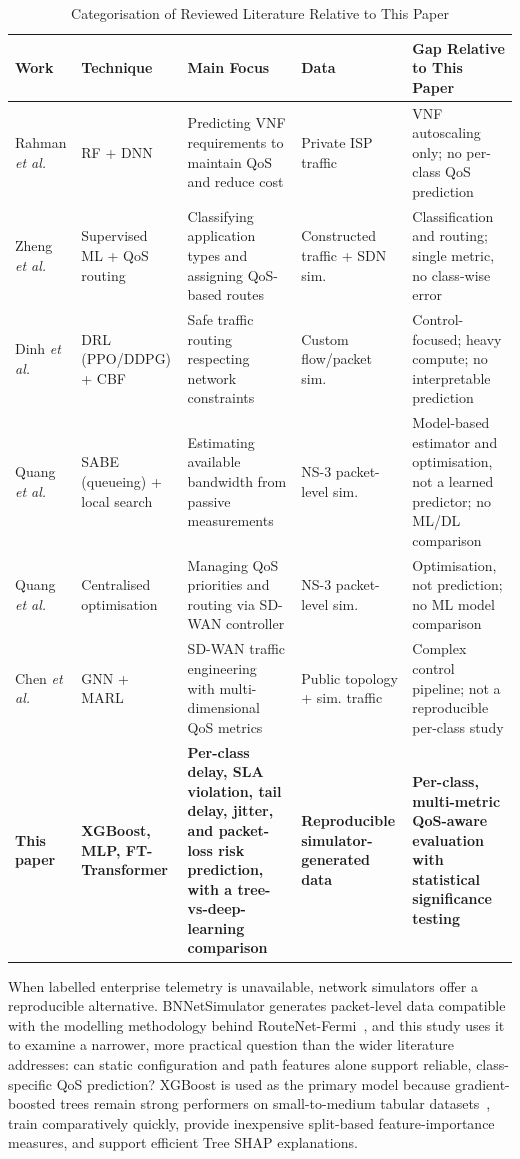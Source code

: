 \documentclass[conference]{IEEEtran}
\begin{document}
\begin{table}[t]
\caption{Categorisation of Reviewed Literature Relative to This Paper}
\label{tab:lit-comparison}
\centering
\scriptsize
\setlength{\tabcolsep}{4pt}
\begin{tabular}{p{2.1cm}p{2.4cm}p{3.3cm}p{2.1cm}p{4.7cm}}
\toprule
Work & Technique & Main Focus & Data & Gap Relative to This Paper \\
\midrule
Rahman \emph{et al.}~\cite{rahman2019autoscaling} & RF + DNN & Predicting VNF requirements to maintain QoS and reduce cost & Private ISP traffic & VNF autoscaling only; no per-class QoS prediction \\
Zheng \emph{et al.}~\cite{zheng2022applicationaware} & Supervised ML + QoS routing & Classifying application types and assigning QoS-based routes & Constructed traffic + SDN sim. & Classification and routing; single metric, no class-wise error \\
Dinh \emph{et al.}~\cite{dinh2024safeloadbalancing} & DRL (PPO/DDPG) + CBF & Safe traffic routing respecting network constraints & Custom flow/packet sim. & Control-focused; heavy compute; no interpretable prediction \\
Quang \emph{et al.}~\cite{quang2023globalqos} & SABE (queueing) + local search & Estimating available bandwidth from passive measurements & NS-3 packet-level sim. & Model-based estimator and optimisation, not a learned predictor; no ML/DL comparison \\
Quang \emph{et al.}~\cite{quang2022routing} & Centralised optimisation & Managing QoS priorities and routing via SD-WAN controller & NS-3 packet-level sim. & Optimisation, not prediction; no ML model comparison \\
Chen \emph{et al.}~\cite{chen2025mteal} & GNN + MARL & SD-WAN traffic engineering with multi-dimensional QoS metrics & Public topology + sim. traffic & Complex control pipeline; not a reproducible per-class study \\
\textbf{This paper} & \textbf{XGBoost, MLP, FT-Transformer} & \textbf{Per-class delay, SLA violation, tail delay, jitter, and packet-loss risk prediction, with a tree-vs-deep-learning comparison} & \textbf{Reproducible simulator-generated data} & \textbf{Per-class, multi-metric QoS-aware evaluation with statistical significance testing} \\
\bottomrule
\end{tabular}
\end{table}

When labelled enterprise telemetry is unavailable, network simulators offer a reproducible alternative. BNNetSimulator generates packet-level data compatible with the modelling methodology behind RouteNet-Fermi~\cite{bnnupc2023bnnetsimulator,ferriolgalmes2022routenetfermi}, and this study uses it to examine a narrower, more practical question than the wider literature addresses: can static configuration and path features alone support reliable, class-specific QoS prediction? XGBoost is used as the primary model because gradient-boosted trees remain strong performers on small-to-medium tabular datasets~\cite{grinsztajn2022trees,shwartzziv2022tabular}, train comparatively quickly, provide inexpensive split-based feature-importance measures, and support efficient Tree SHAP explanations.
\end{document}
